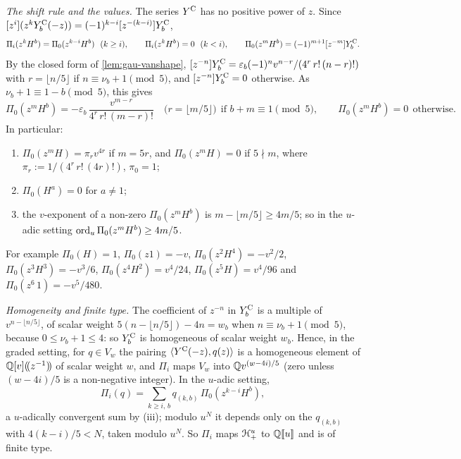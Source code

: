 \emph{The shift rule and the values.} The series $Y^{\mathrm{C}}$ has no positive power of $z$. Since $[z^i](z^kY^{\mathrm{C}}_b(-z)) = (-1)^{k-i}[z^{-(k-i)}]Y^{\mathrm{C}}_b$,
\begin{equation}
\label{eq:tra-shift}
\Pi_i(z^kH^b) = \Pi_0(z^{k-i}H^b)\ \ (k\geq i),\qquad \Pi_i(z^kH^b) = 0\ \ (k<i),\qquad \Pi_0(z^mH^b) = (-1)^{m+1}\coef{z^{-m}}\YC_b .
\end{equation}
By the closed form of \cref{lem:gau-vanshape}, $[z^{-n}]Y^{\mathrm{C}}_b = \varepsilon_b(-1)^nv^{n-r}/(4^r\,r!\,(n-r)!)$ with $r = \lfloor n/5\rfloor$ if $n\equiv\nu_b+1\pmod 5$, and $[z^{-n}]Y^{\mathrm{C}}_b = 0$ otherwise. As $\nu_b+1\equiv 1-b\pmod 5$, this gives
\begin{equation}
\label{eq:tra-values}
\Pi_0(z^mH^b) = -\varepsilon_b\,\frac{v^{m-r}}{4^r\,r!\,(m-r)!}\quad\bigl(r = \lfloor m/5\rfloor\bigr)\ \ \text{if } b+m\equiv 1\pmod 5,\qquad \Pi_0(z^mH^b) = 0\ \ \text{otherwise}.
\end{equation}
In particular:
\begin{enumerate}
\item $\Pi_0(z^mH) = \pi_rv^{4r}$ if $m = 5r$, and $\Pi_0(z^mH) = 0$ if $5\nmid m$, where $\pi_r := 1/(4^r\,r!\,(4r)!)$, $\pi_0 = 1$;
\item $\Pi_0(H^a) = 0$ for $a\neq 1$;
\item the $v$-exponent of a non-zero $\Pi_0(z^mH^b)$ is $m-\lfloor m/5\rfloor\geq 4m/5$; so in the $u$-adic setting $\operatorname{ord}_u\Pi_0(z^mH^b)\geq 4m/5$.
\end{enumerate}
For example $\Pi_0(H) = 1$, $\Pi_0(z1) = -v$, $\Pi_0(z^2H^4) = -v^2/2$, $\Pi_0(z^3H^3) = -v^3/6$, $\Pi_0(z^4H^2) = v^4/24$, $\Pi_0(z^5H) = v^4/96$ and $\Pi_0(z^6\,1) = -v^5/480$.

\emph{Homogeneity and finite type.} The coefficient of $z^{-n}$ in $Y^{\mathrm{C}}_b$ is a multiple of $v^{n-\lfloor n/5\rfloor}$, of scalar weight $5(n-\lfloor n/5\rfloor)-4n = w_b$ when $n\equiv\nu_b+1\pmod 5$, because $0\leq\nu_b+1\leq 4$: so $Y^{\mathrm{C}}_b$ is homogeneous of scalar weight $w_b$. Hence, in the graded setting, for $q\in V_w$ the pairing $\langle Y^{\mathrm{C}}(-z),q(z)\rangle$ is a homogeneous element of $\mathbb{Q}[v](\!(z^{-1})\!)$ of scalar weight $w$, and $\Pi_i$ maps $V_w$ into $\mathbb{Q} v^{(w-4i)/5}$ (zero unless $(w-4i)/5$ is a non-negative integer). In the $u$-adic setting,
\[
\Pi_i(q) = \sum_{k\geq i,\,b}q_{(k,b)}\,\Pi_0(z^{k-i}H^b),
\]
a $u$-adically convergent sum by (iii); modulo $u^N$ it depends only on the $q_{(k,b)}$ with $4(k-i)/5<N$, taken modulo $u^N$. So $\Pi_i$ maps $\mathcal{H}^u_+$ to $\mathbb{Q}[\![ u ]\!]$ and is of finite type.

